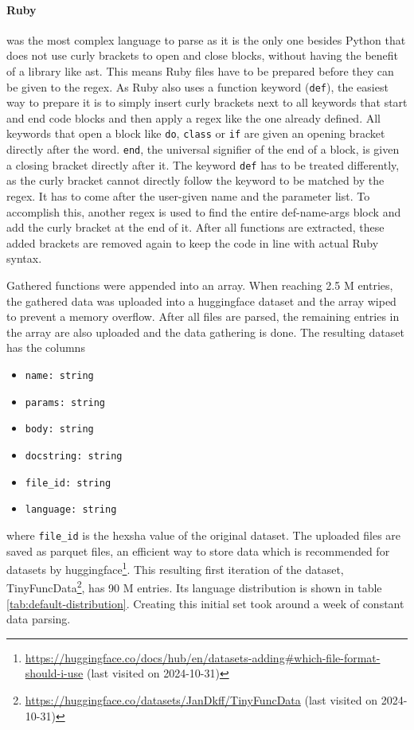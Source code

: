 \paragraph{Ruby} was the most complex language to parse as it is the only one besides Python that does not use curly brackets to open and close blocks, without having the benefit of a library like \ac{ast}.
This means Ruby files have to be prepared before they can be given to the \ac{regex}.
As Ruby also uses a function keyword (\texttt{def}), the easiest way to prepare it is to simply insert curly brackets next to all keywords that start and end code blocks and then apply a \ac{regex} like the one already defined.
All keywords that open a block like \texttt{do}, \texttt{class} or \texttt{if} are given an opening bracket directly after the word.
\texttt{end}, the universal signifier of the end of a block, is given a closing bracket directly after it.
The keyword \texttt{def} has to be treated differently, as the curly bracket cannot directly follow the keyword to be matched by the \ac{regex}.
It has to come after the user-given name and the parameter list.
To accomplish this, another \ac{regex} is used to find the entire def-name-args block and add the curly bracket at the end of it.
After all functions are extracted, these added brackets are removed again to keep the code in line with actual Ruby syntax.
\newline

Gathered functions were appended into an array.
When reaching 2.5 M entries, the gathered data was uploaded into a huggingface dataset and the array wiped to prevent a memory overflow.
After all files are parsed, the remaining entries in the array are also uploaded and the data gathering is done.
The resulting dataset has the columns
\begin{itemize}
    \item \texttt{name: string}
    \item \texttt{params: string}
    \item \texttt{body: string}
    \item \texttt{docstring: string}
    \item \texttt{file\_id: string}
    \item \texttt{language: string}
\end{itemize}
where \texttt{file\_id} is the hexsha value of the original dataset.
The uploaded files are saved as parquet files, an efficient way to store data which is recommended for datasets by huggingface\footnote{\url{https://huggingface.co/docs/hub/en/datasets-adding\#which-file-format-should-i-use} (last visited on 2024-10-31)}.
This resulting first iteration of the dataset, TinyFuncData\footnote{\url{https://huggingface.co/datasets/JanDkff/TinyFuncData} (last visited on 2024-10-31)}, has 90 M entries.
Its language distribution is shown in table \ref{tab:default-distribution}.
Creating this initial set took around a week of constant data parsing.

